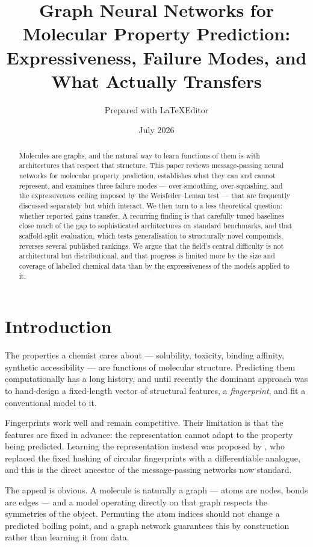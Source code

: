 \documentclass[11pt,a4paper]{article}
\title{Graph Neural Networks for Molecular Property Prediction:\\
       Expressiveness, Failure Modes, and What Actually Transfers}
\author{Prepared with LaTeXEditor}
\date{July 2026}
\begin{document}
\maketitle

\begin{abstract}
Molecules are graphs, and the natural way to learn functions of them is with
architectures that respect that structure. This paper reviews message-passing
neural networks for molecular property prediction, establishes what they can
and cannot represent, and examines three failure modes --- over-smoothing,
over-squashing, and the expressiveness ceiling imposed by the
Weisfeiler--Leman test --- that are frequently discussed separately but which
interact. We then turn to a less theoretical question: whether reported gains
transfer. A recurring finding is that carefully tuned baselines close much of
the gap to sophisticated architectures on standard benchmarks, and that
scaffold-split evaluation, which tests generalisation to structurally novel
compounds, reverses several published rankings. We argue that the field's
central difficulty is not architectural but distributional, and that progress
is limited more by the size and coverage of labelled chemical data than by the
expressiveness of the models applied to it.
\end{abstract}

\tableofcontents

\section{Introduction}
\label{sec:intro}

The properties a chemist cares about --- solubility, toxicity, binding
affinity, synthetic accessibility --- are functions of molecular structure.
Predicting them computationally has a long history, and until recently the
dominant approach was to hand-design a fixed-length vector of structural
features, a \emph{fingerprint}, and fit a conventional model to it.

Fingerprints work well and remain competitive. Their limitation is that the
features are fixed in advance: the representation cannot adapt to the property
being predicted. Learning the representation instead was proposed by
\cite{duvenaud2015}, who replaced the fixed hashing of circular fingerprints
with a differentiable analogue, and this is the direct ancestor of the
message-passing networks now standard.

The appeal is obvious. A molecule is naturally a graph --- atoms are nodes,
bonds are edges --- and a model operating directly on that graph respects the
symmetries of the object. Permuting the atom indices should not change a
predicted boiling point, and a graph network guarantees this by construction
rather than learning it from data.
\end{document}

